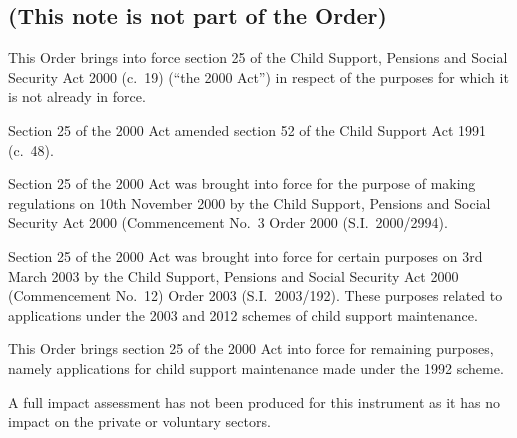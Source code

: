 \documentclass[12pt,a4paper]{article}
\begin{document}
\renewcommand\parthead{— Explanatory Note}

\subsection*{(This note is not part of the Order)}

This Order brings into force section 25 of the Child Support, Pensions and Social Security Act 2000 (c.~19) (“the 2000 Act”) in respect of the purposes for which it is not already in force.

Section 25 of the 2000 Act amended section 52 of the Child Support Act 1991 (c.~48).

Section 25 of the 2000 Act was brought into force for the purpose of making regulations on 10th November 2000 by the Child Support, Pensions and Social Security Act 2000 (Commencement No.~3 Order 2000 (S.I.~2000/2994).

Section 25 of the 2000 Act was brought into force for certain purposes on 3rd March 2003 by the Child Support, Pensions and Social Security Act 2000 (Commencement No.~12) Order 2003 (S.I.~2003/192). These purposes related to applications under the 2003 and 2012 schemes of child support maintenance.

This Order brings section 25 of the 2000 Act into force for remaining purposes, namely applications for child support maintenance made under the 1992 scheme.

A full impact assessment has not been produced for this instrument as it has no impact on the private or voluntary sectors. 
\end{document}
